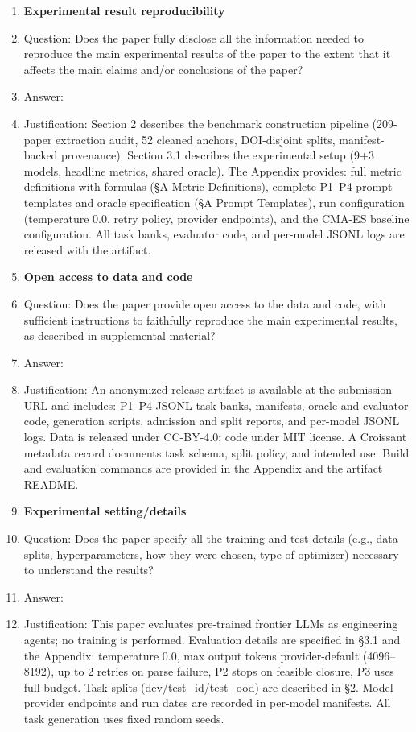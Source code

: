 \begin{enumerate}
\item {\bf Experimental result reproducibility}
    \item[] Question: Does the paper fully disclose all the information needed to reproduce the main experimental results of the paper to the extent that it affects the main claims and/or conclusions of the paper?
    \item[] Answer: \answerYes{}
    \item[] Justification: Section 2 describes the benchmark construction pipeline (209-paper extraction audit, 52 cleaned anchors, DOI-disjoint splits, manifest-backed provenance). Section 3.1 describes the experimental setup (9+3 models, headline metrics, shared oracle). The Appendix provides: full metric definitions with formulas (§A Metric Definitions), complete P1--P4 prompt templates and oracle specification (§A Prompt Templates), run configuration (temperature 0.0, retry policy, provider endpoints), and the CMA-ES baseline configuration. All task banks, evaluator code, and per-model JSONL logs are released with the artifact.

\item {\bf Open access to data and code}
    \item[] Question: Does the paper provide open access to the data and code, with sufficient instructions to faithfully reproduce the main experimental results, as described in supplemental material?
    \item[] Answer: \answerYes{}
    \item[] Justification: An anonymized release artifact is available at the submission URL and includes: P1--P4 JSONL task banks, manifests, oracle and evaluator code, generation scripts, admission and split reports, and per-model JSONL logs. Data is released under CC-BY-4.0; code under MIT license. A Croissant metadata record documents task schema, split policy, and intended use. Build and evaluation commands are provided in the Appendix and the artifact README.

\item {\bf Experimental setting/details}
    \item[] Question: Does the paper specify all the training and test details (e.g., data splits, hyperparameters, how they were chosen, type of optimizer) necessary to understand the results?
    \item[] Answer: \answerYes{}
    \item[] Justification: This paper evaluates pre-trained frontier LLMs as engineering agents; no training is performed. Evaluation details are specified in §3.1 and the Appendix: temperature 0.0, max output tokens provider-default (4096--8192), up to 2 retries on parse failure, P2 stops on feasible closure, P3 uses full budget. Task splits (dev/test\_id/test\_ood) are described in §2. Model provider endpoints and run dates are recorded in per-model manifests. All task generation uses fixed random seeds.


\end{enumerate}
